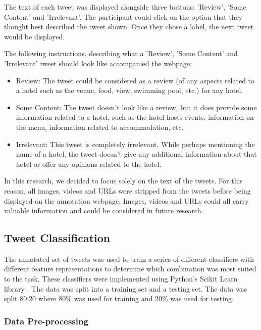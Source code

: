 The text of each tweet was displayed alongside three buttons: 'Review', 'Some Content' and 'Irrelevant'. The participant could click on the option that they thought best described the tweet shown. Once they chose a label, the next tweet would be displayed. 

The following instructions, describing what a 'Review', 'Some Content' and 'Irrelevant' tweet should look like accompanied the webpage:
\begin{itemize}
    \item Review: The tweet could be considered as a review (of any aspects related to a hotel such as the venue, food, view, swimming pool, etc.) for any hotel.
    \item Some Content: The tweet doesn't look like a review, but it does provide some information related to a hotel, such as the hotel hosts events, information on the menu, information related to accommodation, etc. 
    \item Irrelevant: This tweet is completely irrelevant. While perhaps mentioning the name of a hotel, the tweet doesn't give any additional information about that hotel or offer any opinions related to the hotel.
\end{itemize}

In this research, we decided to focus solely on the text of the tweets. For this reason, all images, videos and URLs were stripped from the tweets before being displayed on the annotation webpage. Images, videos and URLs could all carry valuable information and could be considered in future research. 

\subsection{Tweet Classification}
The annotated set of tweets was used to train a series of different classifiers with different feature representations to determine which combination was most suited to the task. These classifiers were implemented using Python's Scikit Learn library \cite{scikit-learn}. The data was split into a training set and a testing set. The data was split 80:20 where 80\% was used for training and 20\% was used for testing.

\subsubsection{Data Pre-processing}

